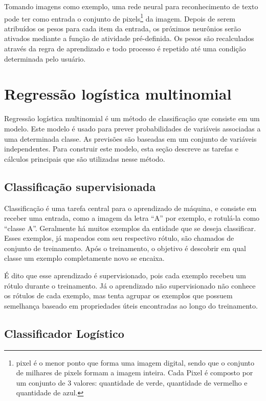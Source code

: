 Tomando imagens como exemplo, uma rede neural para reconhecimento de
texto pode ter como entrada o conjunto de pixels\footnote{pixel é o
  menor ponto que forma uma imagem digital, sendo que o conjunto de
  milhares de pixels formam a imagem inteira. Cada Pixel é composto
  por um conjunto de 3 valores: quantidade de verde, quantidade de
  vermelho e quantidade de azul.} da imagem. Depois de serem
atribuídos os pesos para cada item da entrada, os próximos neurônios
serão ativados mediante a função de atividade pré-definida. Os pesos
são recalculados através da regra de aprendizado e todo processo é
repetido até uma condição determinada pelo usuário.

\section{Regressão logística multinomial}

Regressão logística multinomial é um método de classificação que
consiste em um modelo. Este modelo é usado para prever probabilidades
de variáveis associadas a uma determinada classe. As previsões são
baseadas em um conjunto de variáveis independentes. Para construir
este modelo, esta seção descreve as tarefas e cálculos principais que
são utilizadas nesse método.

\subsection{Classificação supervisionada}

Classificação é uma tarefa central para o aprendizado de máquina, e
consiste em receber uma entrada, como a imagem da letra ``A'' por
exemplo, e rotulá-la como ``classe A''. Geralmente há muitos
exemplos da entidade que se deseja classificar. Esses exemplos, já
mapeados com seu respectivo rótulo, são chamados de conjunto de
treinamento. Após o treinamento, o objetivo é descobrir em qual classe
um exemplo completamente novo se encaixa.

É dito que esse aprendizado é
supervisionado\cite{Goodfellow-et-al-2016-Book}, pois cada exemplo
recebeu um rótulo durante o treinamento. Já o aprendizado não
supervisionado não conhece os rótulos de cada exemplo, mas tenta
agrupar os exemplos que possuem semelhança baseado em propriedades
úteis encontradas ao longo do treinamento.

\subsection{Classificador Logístico}

